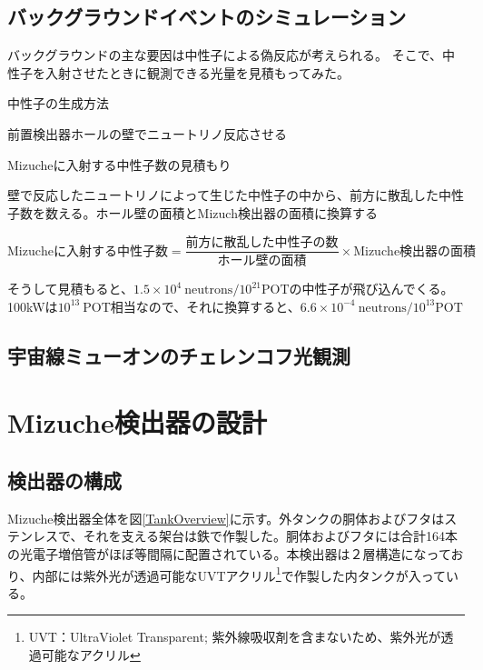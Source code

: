 \documentclass[11pt]{jreport}
\newcommand{\figref}[1]{図\ref{#1}}
\begin{document}
\section{バックグラウンドイベントのシミュレーション}

バックグラウンドの主な要因は中性子による偽反応が考えられる。
そこで、中性子を入射させたときに観測できる光量を見積もってみた。

中性子の生成方法

前置検出器ホールの壁でニュートリノ反応させる

Mizucheに入射する中性子数の見積もり

壁で反応したニュートリノによって生じた中性子の中から、前方に散乱した中性子数を数える。ホール壁の面積とMizuch検出器の面積に換算する

\begin{equation}
\text{Mizucheに入射する中性子数} = \frac{\text{前方に散乱した中性子の数}}{\text{ホール壁の面積}} \times \text{Mizuche検出器の面積}
\end{equation}

そうして見積もると、$1.5\times10^{4}\ \mathrm{neutrons/10^{21}POT}$の中性子が飛び込んでくる。100kWは$10^{13}\ \mathrm{POT}$相当なので、それに換算すると、$6.6\times 10^{-4}\ \mathrm{neutrons/10^{13}POT}$


\section{宇宙線ミューオンのチェレンコフ光観測}
\fi%

\chapter{Mizuche検出器の設計}
\section{検出器の構成}
Mizuche検出器全体を\figref{TankOverview}に示す。外タンクの胴体およびフタはステンレスで、それを支える架台は鉄で作製した。胴体およびフタには合計164本の光電子増倍管がほぼ等間隔に配置されている。本検出器は２層構造になっており、内部には紫外光が透過可能なUVTアクリル\footnote{UVT：UltraViolet Transparent; 紫外線吸収剤を含まないため、紫外光が透過可能なアクリル}で作製した内タンクが入っている。
\end{document}
